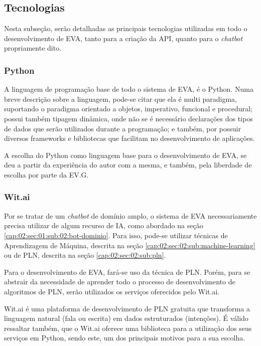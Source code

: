 \subsection{Tecnologias}

Nesta subseção, serão detalhadas as principais tecnologias utilizadas em todo o desenvolvimento de EVA, tanto para a criação da API, quanto para o \textit{chatbot} propriamente dito.

\subsubsection{Python}

A linguagem de programação base de todo o sistema de EVA, é o Python. Numa breve descrição sobre a linguagem, pode-se citar que ela é multi paradigma, suportando o paradigma orientado a objetos, imperativo, funcional e procedural; possui também tipagem dinâmica, onde não se é necessário declarações dos tipos de dados que serão utilizados durante a programação; e também, por possuir diversos frameworks e bibliotecas que facilitam no desenvolvimento de aplicações.

A escolha do Python como linguagem base para o desenvolvimento de EVA, se deu a partir da experiência do autor com a mesma, e também, pela liberdade de escolha por parte da EV.G.

\subsubsection{Wit.ai}

Por se tratar de um \textit{chatbot} de domínio amplo, o sistema de EVA necessariamente precisa utilizar de algum recurso de IA, como abordado na seção \ref{cap:02:sec:01:sub:02:bot-dominio}. Para isso, pode-se utilizar técnicas de Aprendizagem de Máquina, descrita na seção \ref{cap:02:sec:02:sub:machine-learning} ou de PLN, descrita na seção \ref{cap:02:sec:02:sub:pln}.

Para o desenvolvimento de EVA, fará-se uso da técnica de PLN. Porém, para se abstrair da necessidade de aprender todo o processo de desenvolvimento de algoritmos de PLN, serão utilizados os serviços oferecidos pelo Wit.ai.

 Wit.ai é uma plataforma de desenvolvimento de PLN gratuita que transforma a linguagem natural (fala ou escrita) em dados estruturados (intenções). É válido ressaltar também, que o Wit.ai oferece uma biblioteca para a utilização dos seus serviços em Python, sendo este, um dos principais motivos para a sua escolha.

